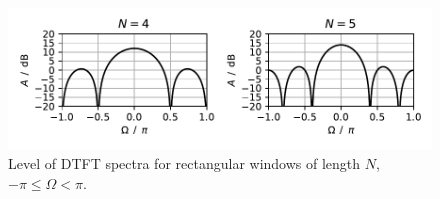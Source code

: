 \documentclass[11pt,a4paper,DIV=12]{scrartcl}
\begin{document}
\begin{figure}
		\centering
		\includegraphics[]{graphics/RectWindow_DTFT_DFT_log_sym.pdf}
		\caption{Level of DTFT spectra for rectangular windows of length $N$,
		$-\pi\leq\Omega<\pi$.}
		\label{RectWindow_DTFT_log_sym}
\end{figure}

\end{document}
